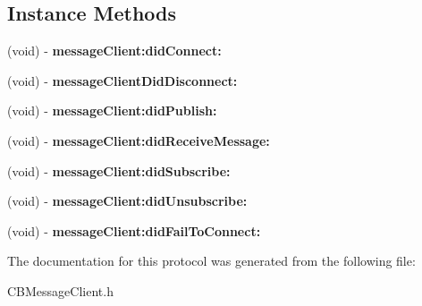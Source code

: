 \subsection*{Instance Methods}
\begin{DoxyCompactItemize}
\item 
\hypertarget{protocol_c_b_message_client_delegate-p_a867359ed1027be7ddfd607a548e3ba96}{(void) -\/ {\bfseries message\-Client\-:did\-Connect\-:}}\label{protocol_c_b_message_client_delegate-p_a867359ed1027be7ddfd607a548e3ba96}

\item 
\hypertarget{protocol_c_b_message_client_delegate-p_a561503ecf3dfabb58045d5ce2a872866}{(void) -\/ {\bfseries message\-Client\-Did\-Disconnect\-:}}\label{protocol_c_b_message_client_delegate-p_a561503ecf3dfabb58045d5ce2a872866}

\item 
\hypertarget{protocol_c_b_message_client_delegate-p_a176ec5e85afee0e0277b70ffb4b4979e}{(void) -\/ {\bfseries message\-Client\-:did\-Publish\-:}}\label{protocol_c_b_message_client_delegate-p_a176ec5e85afee0e0277b70ffb4b4979e}

\item 
\hypertarget{protocol_c_b_message_client_delegate-p_a7b462fdbc23f08496107696bbe84f580}{(void) -\/ {\bfseries message\-Client\-:did\-Receive\-Message\-:}}\label{protocol_c_b_message_client_delegate-p_a7b462fdbc23f08496107696bbe84f580}

\item 
\hypertarget{protocol_c_b_message_client_delegate-p_acdd39cc46ad4e0fcf0b9d5369d358b87}{(void) -\/ {\bfseries message\-Client\-:did\-Subscribe\-:}}\label{protocol_c_b_message_client_delegate-p_acdd39cc46ad4e0fcf0b9d5369d358b87}

\item 
\hypertarget{protocol_c_b_message_client_delegate-p_abf3a4f817617e81ecc7e4c8ae714bc46}{(void) -\/ {\bfseries message\-Client\-:did\-Unsubscribe\-:}}\label{protocol_c_b_message_client_delegate-p_abf3a4f817617e81ecc7e4c8ae714bc46}

\item 
\hypertarget{protocol_c_b_message_client_delegate-p_ae655148c101c94f59c118b765efa9513}{(void) -\/ {\bfseries message\-Client\-:did\-Fail\-To\-Connect\-:}}\label{protocol_c_b_message_client_delegate-p_ae655148c101c94f59c118b765efa9513}

\end{DoxyCompactItemize}


The documentation for this protocol was generated from the following file\-:\begin{DoxyCompactItemize}
\item 
C\-B\-Message\-Client.\-h\end{DoxyCompactItemize}
